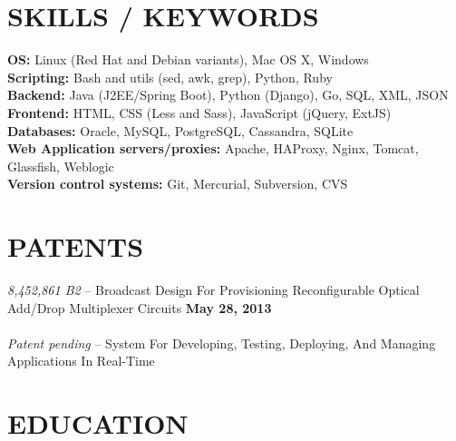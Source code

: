 \documentclass[margin,line]{resume}
\begin{document}
\begin{resume}
    \vspace{-1mm}

\sectionline

    \section{\mysidestyle \textbf{\large{S}\small{KILLS} / \large{K}\small{EYWORDS}}}
    \textbf{OS:} Linux (Red Hat and Debian variants), Mac OS X, Windows \\
    \textbf{Scripting:} Bash and utils (sed, awk, grep), Python, Ruby\\
    \textbf{Backend:} Java (J2EE/Spring Boot), Python (Django), Go, SQL, XML, JSON\\
    \textbf{Frontend:} HTML, CSS (Less and Sass), JavaScript (jQuery, ExtJS)\\
    \textbf{Databases:} Oracle, MySQL, PostgreSQL, Cassandra, SQLite\\
    \textbf{Web Application servers/proxies:} Apache, HAProxy, Nginx, Tomcat, Glassfish, Weblogic\\
    \textbf{Version control systems:} Git, Mercurial, Subversion, CVS\\

\sectionline

    \section{\mysidestyle \textbf{\large{P}\small{ATENTS}}}
    \textsl{8,452,861 B2} -- Broadcast Design For Provisioning Reconfigurable Optical Add/Drop Multiplexer Circuits \hfill \textbf{May 28, 2013}\\\\
    \textsl{Patent pending} -- System For Developing, Testing, Deploying, And Managing Applications In Real-Time\\
    \vspace{-4mm}

\sectionline


    \section{\mysidestyle \textbf{\large{E}\small{DUCATION}}}


\end{resume}
\end{document}
